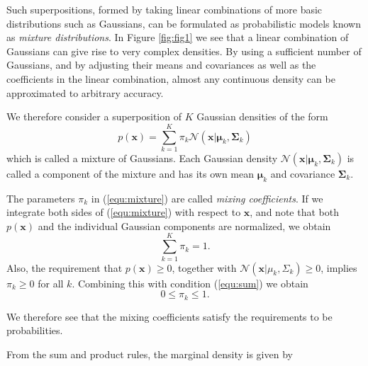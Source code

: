 ﻿\documentclass[a4paper, 11pt]{article}
\numberwithin{equation}{subsection}
\begin{document}
Such superpositions, formed by taking linear combinations of more basic distributions such as Gaussians, can be formulated as probabilistic models known as \emph{mixture distributions}. In Figure \ref{fig:fig1} we see that a linear combination of Gaussians can give rise to very complex densities. By using a sufficient number of Gaussians, and by adjusting their means and covariances as well as the coefficients in the linear combination, almost any continuous density can be approximated to arbitrary accuracy.

We therefore consider a superposition of $K$ Gaussian densities of the form
\begin{equation}\label{equ:mixture}
p(\mathbf x)=\sum_{k=1}^K\pi_k\mathcal N(\mathbf x|\boldsymbol\mu_k,\boldsymbol\Sigma_k)
\end{equation}
which is called a mixture of Gaussians. Each Gaussian density  $\mathcal N(\mathbf x|\boldsymbol\mu_k,\boldsymbol\Sigma_k)$ is called a component of the mixture and has its own mean $\boldsymbol\mu_k$ and covariance $\boldsymbol\Sigma_k$.

The parameters $\pi_k$ in (\ref{equ:mixture}) are called \emph{mixing coefficients}. If we integrate both sides of (\ref{equ:mixture}) with respect to $\mathbf x$, and note that both $p(\mathbf x)$ and the individual Gaussian
components are normalized, we obtain
\begin{equation}\label{equ:sum}
\sum_{k=1}^{K}\pi_k=1.
\end{equation}
Also, the requirement that $p(\mathbf x)\geq 0$, together with $\mathcal N(\mathbf x|\mu_k,\Sigma_k)\geq 0$, implies $\pi_k\geq 0$ for all $k$. Combining this with condition (\ref{equ:sum}) we obtain
\begin{equation}
0\leq\pi_k\leq 1.
\end{equation}

We therefore see that the mixing coefficients satisfy the requirements to be probabilities.

From the sum and product rules, the marginal density is given by
\end{document}
